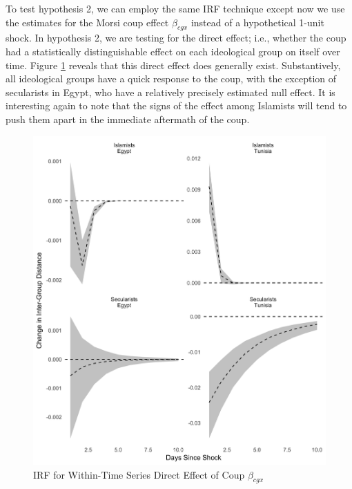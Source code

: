 \documentclass[12pt]{article}
\begin{document}
To test hypothesis 2, we can employ the same IRF technique except now we use the estimates for the Morsi coup effect $\beta_{cgx}$ instead of a hypothetical 1-unit shock. In hypothesis 2, we are testing for the direct effect; i.e., whether the coup had a statistically distinguishable effect on each ideological group on itself over time. Figure \ref{within_betax} reveals that this direct effect does generally exist. Substantively, all ideological groups have a quick response to the coup, with the exception of secularists in Egypt, who have a relatively precisely estimated null effect. It is interesting again to note that the signs of the effect among Islamists will tend to push them apart in the immediate aftermath of the coup.
 \begin{figure}[!h]
	\centering
	\caption{IRF for Within-Time Series Direct Effect of Coup $\beta_{cgx}$}\label{within_betax}
	\centering
	\includegraphics[width=.9\linewidth]{irf_betax_within}
\end{figure}
\end{document}
